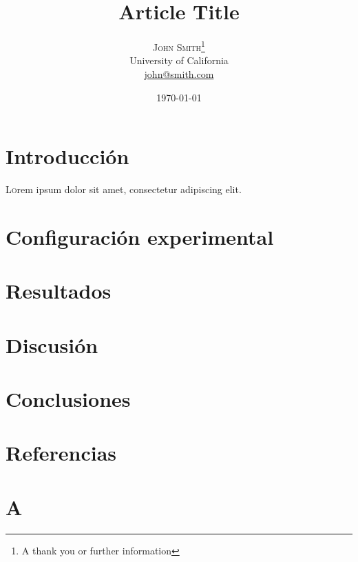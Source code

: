 \documentclass[twoside,twocolumn]{article}
\title{Article Title}                                   %
\author{%
    \textsc{John Smith}\thanks{A thank you or further information} \\[1ex]     %
    \normalsize University of California \\                                    %
    \normalsize \href{mailto:john@smith.com}{john@smith.com}                   %
  }
\date{\today}                                                                %
\begin{document}
  
  \maketitle              %
  
  \section{Introducción}\label{sec:introduccion}
  \lettrine[nindent=0em,lines=2]{L} orem ipsum dolor sit amet, consectetur adipiscing elit.
  \blindtext

  \section{Configuración experimental}\label{sec:conf_exp}
  \blindtext

  \section{Resultados}\label{sec:resultados}
  \blindtext
    
  \section{Discusión}\label{sec:discusion}
  \blindtext

  \section{Conclusiones}\label{sec:conclusiones}
  \blindtext
  
  \section{Referencias}\label{sec:bibliography}
    
  
  

%
%
   
  \clearpage
  \appendix
    
  \section{A}\label{sec:ap_a}

  
\end{document}
